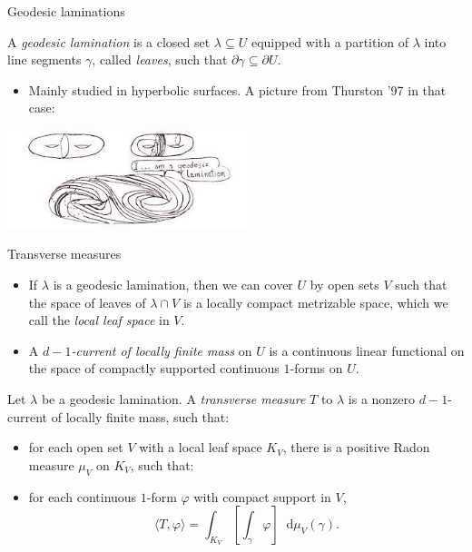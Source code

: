 \documentclass[10pt]{beamer}
\newcommand*\dif{\mathop{}\!\mathrm{d}}
\begin{document}
\begin{frame}{Geodesic laminations}
\begin{definition}
A \emph{geodesic lamination} is a closed set $\lambda \subseteq U$ equipped with a partition of $\lambda$ into line segments $\gamma$, called \emph{leaves}, such that $\partial \gamma \subseteq \partial U$. 
\end{definition}

\begin{itemize}
\item Mainly studied in hyperbolic surfaces. A picture from Thurston '97 in that case:
\end{itemize}

\centering 
\includegraphics[width=7cm]{GeodesicLamination.jpg}
    
\end{frame}

\begin{frame}{Transverse measures}
\begin{itemize}
\item If $\lambda$ is a geodesic lamination, then we can cover $U$ by open sets $V$ such that the space of leaves of $\lambda \cap V$ is a locally compact metrizable space, which we call the \emph{local leaf space} in $V$.
\item A \emph{$d - 1$-current of locally finite mass} on $U$ is a continuous linear functional on the space of compactly supported continuous $1$-forms on $U$.
\end{itemize}

\begin{definition}
Let $\lambda$ be a geodesic lamination.
A \emph{transverse measure} $T$ to $\lambda$ is a nonzero $d - 1$-current of locally finite mass, such that:
\begin{itemize}
\item for each open set $V$ with a local leaf space $K_V$, there is a positive Radon measure $\mu_V$ on $K_V$, such that:
\item for each continuous $1$-form $\varphi$ with compact support in $V$,
$$\langle T, \varphi\rangle = \int_{K_V} \left[\int_\gamma \varphi\right] \dif \mu_V(\gamma).$$
\end{itemize}
\end{definition}
\end{frame}
\end{document}
